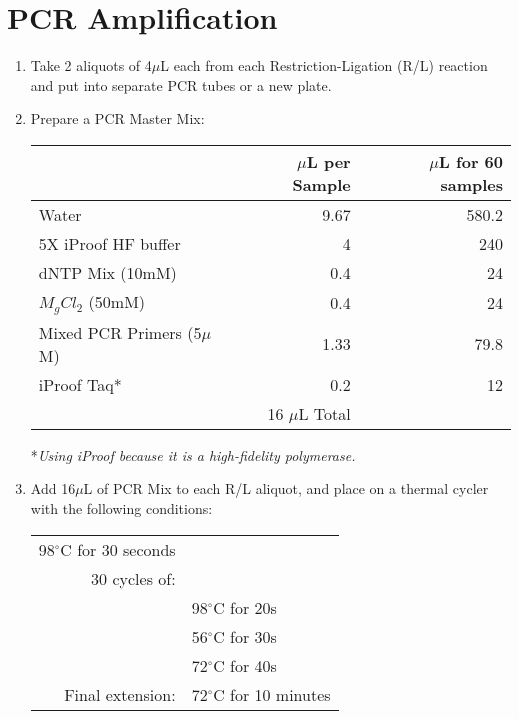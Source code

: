 \documentclass{article}
\begin{document}
\section{PCR Amplification}
\begin{enumerate}
	\item Take 2 aliquots of 4$\mu$L each from each Restriction-Ligation (R/L) reaction and put into separate PCR tubes or a new plate.

	\item Prepare a PCR Master Mix:
	\begin{center}
	\begin{tabular}{l|r|r}
	\hline
	&	$\mu$L per Sample	&	$\mu$L for 60 samples\\
	\hline
	Water & 9.67 & 580.2 \\
	5X iProof HF buffer & 4 & 240\\
	dNTP Mix (10mM) & 0.4 & 24\\
	$M_{g}Cl_{2}$ (50mM) & 0.4 & 24\\
	Mixed PCR Primers (5$\mu$M) & 1.33 & 79.8\\
	iProof Taq* & 0.2 & 12\\
	\hline
	&   16 $\mu$L Total & \\
	\hline
	\end{tabular}
	*\emph{Using iProof because it is a high-fidelity polymerase.}
	\end{center}


	\item  Add 16$\mu$L of PCR Mix to each R/L aliquot, and place on a thermal cycler with the following conditions:
	\begin{center}
	\begin{tabular}{|rl|}
	\hline
	98$^{\circ}$C for 30 seconds & \\
	30 cycles of: & \\
	&	98$^{\circ}$C for 20s \\
	&	56$^{\circ}$C for 30s \\
	&	72$^{\circ}$C for 40s \\
	Final extension: & 72$^{\circ}$C for 10 minutes\\
	\hline
	\end{tabular}
	\end{center}
\end{enumerate}	
	
\end{document}
